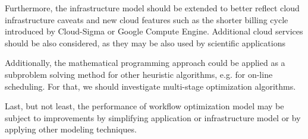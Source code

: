 Furthermore, the infrastructure model should be extended to better reflect cloud infrastructure caveats and new cloud features such as the shorter billing cycle introduced by Cloud-Sigma or Google Compute Engine. Additional cloud services should be also considered, as they may be also used by scientific applications

Additionally, the mathematical programming approach could be applied as a subproblem solving method for other heuristic algorithms, e.g. for on-line scheduling. For that, we should investigate multi-stage optimization algorithms.

Last, but not least, the performance of workflow optimization model may be subject to improvements by simplifying application or infrastructure model or by applying other modeling techniques.


